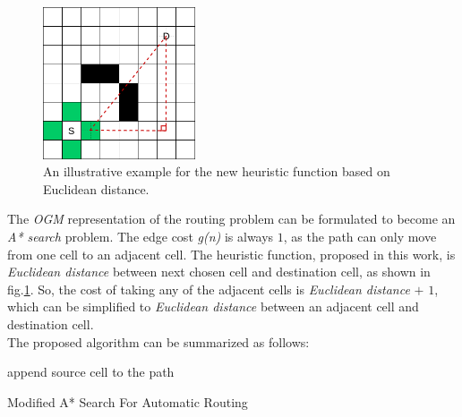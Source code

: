\begin{figure}[H]
    \centering
    \includegraphics[width=0.4\textwidth]{figures/grid_euclid.png}
    \caption{An illustrative example for the new heuristic function based on Euclidean distance.}
    \label{fig:euclid}
\end{figure}

The \emph{OGM} representation of the routing problem can be formulated to become an \emph{A* search} problem. The edge cost \emph{g(n)} is always $1$, as the path can only move from one cell to an adjacent cell. The heuristic function, proposed in this work, is \emph{Euclidean distance} between next chosen cell and destination cell, as shown in  fig.\ref{fig:euclid}. So, the cost of taking any of the adjacent cells is \emph{Euclidean distance} $+$ $1$, which can be simplified to \emph{Euclidean distance} between an adjacent cell and destination cell.\\

The proposed algorithm can be summarized as follows:

\begin{algorithm}[]
\SetAlgoLined
{}
 append source cell to the path\;
 \caption{Modified A* Search For Automatic Routing}
\end{algorithm}
